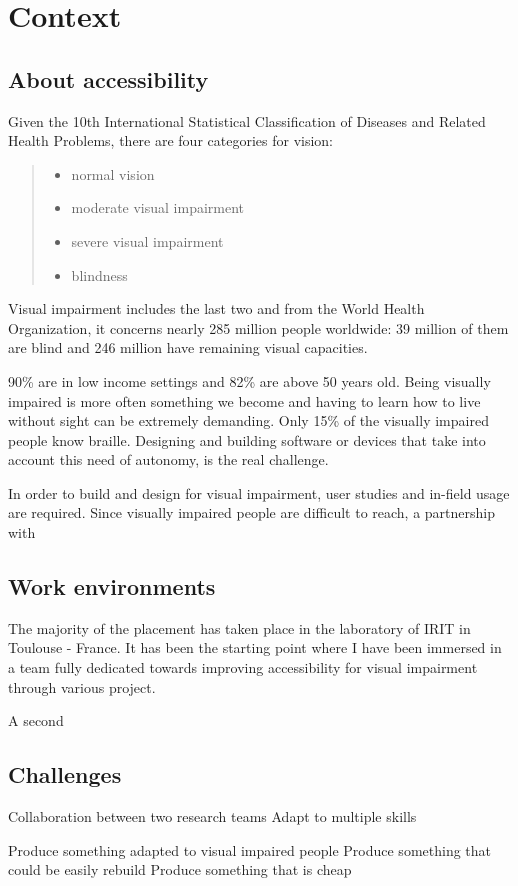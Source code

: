 \chapter{Context}

\section{About accessibility}\label{about-accessibility}

Given the 10th International Statistical Classification of Diseases and
Related Health Problems, there are four categories for vision:

\begin{quote}
\begin{itemize}
\item
  normal vision
\item
  moderate visual impairment
\item
  severe visual impairment
\item
  blindness
\end{itemize}
\end{quote}

Visual impairment includes the last two and from the World Health
Organization, it concerns nearly 285 million people worldwide: 39
million of them are blind and 246 million have remaining visual
capacities.

90\% are in low income settings and 82\% are above 50 years old. Being
visually impaired is more often something we become and having to learn
how to live without sight can be extremely demanding. Only 15\% of the
visually impaired people know braille. Designing and building software
or devices that take into account this need of autonomy, is the real
challenge.

In order to build and design for visual impairment, user studies and
in-field usage are required. Since visually impaired people are
difficult to reach, a partnership with


\section{Work environments}\label{work-environments}

The majority of the placement has taken place in the laboratory of IRIT
in Toulouse - France. It has been the starting point where I have been
immersed in a team fully dedicated towards improving accessibility for
visual impairment through various project.

A second

\section{Challenges}\label{challenges}

Collaboration between two research teams Adapt to multiple skills

Produce something adapted to visual impaired people Produce something
that could be easily rebuild Produce something that is cheap

